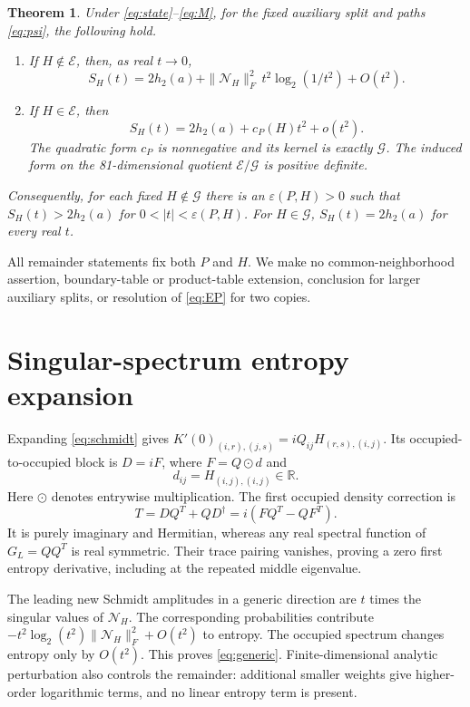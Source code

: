 \documentclass[11pt]{article}
\newcommand{\R}{\mathbb R}
\newcommand{\cE}{\mathcal E}
\newcommand{\cG}{\mathcal G}
\newtheorem{theorem}{Theorem}
\begin{document}
\begin{theorem}\label{thm:main}
Under \eqref{eq:state}--\eqref{eq:M}, for the fixed auxiliary split and paths \eqref{eq:psi}, the following hold.
\begin{enumerate}
\item If $H\notin\cE$, then, as real $t\to0$,
\begin{equation}\label{eq:generic}
 S_H(t)=2h_2(a)+\|\mathcal N_H\|_F^2\,
           t^2\log_2(1/t^2)+O(t^2).
\end{equation}
\item If $H\in\cE$, then
\begin{equation}\label{eq:quadratic}
 S_H(t)=2h_2(a)+c_P(H)t^2+o(t^2).
\end{equation}
The quadratic form $c_P$ is nonnegative and its kernel is exactly $\cG$. The induced form on the 81-dimensional quotient $\cE/\cG$ is positive definite.
\end{enumerate}
Consequently, for each fixed $H\notin\cG$ there is an $\varepsilon(P,H)>0$ such that $S_H(t)>2h_2(a)$ for $0<|t|<\varepsilon(P,H)$. For $H\in\cG$, $S_H(t)=2h_2(a)$ for every real $t$.
\end{theorem}
All remainder statements fix both $P$ and $H$. We make no common-neighborhood assertion, boundary-table or product-table extension, conclusion for larger auxiliary splits, or resolution of \eqref{eq:EP} for two copies.

\section{Singular-spectrum entropy expansion}
Expanding \eqref{eq:schmidt} gives $K'(0)_{(i,r),(j,s)}=iQ_{ij}H_{(r,s),(i,j)}$. Its occupied-to-occupied block is $D=iF$, where $F=Q\odot d$ and
\begin{equation}\label{eq:diagphase}
 d_{ij}=H_{(i,j),(i,j)}\in\R.
\end{equation}
Here $\odot$ denotes entrywise multiplication. The first occupied density correction is
\begin{equation}\label{eq:T}
 T=DQ^T+QD^\dagger=i(FQ^T-QF^T).
\end{equation}
It is purely imaginary and Hermitian, whereas any real spectral function of $G_L=QQ^T$ is real symmetric. Their trace pairing vanishes, proving a zero first entropy derivative, including at the repeated middle eigenvalue.

The leading new Schmidt amplitudes in a generic direction are $t$ times the singular values of $\mathcal N_H$. The corresponding probabilities contribute
$-t^2\log_2(t^2)\|\mathcal N_H\|_F^2+O(t^2)$ to entropy. The occupied spectrum changes entropy only by $O(t^2)$. This proves \eqref{eq:generic}. Finite-dimensional analytic perturbation also controls the remainder: additional smaller weights give higher-order logarithmic terms, and no linear entropy term is present.
\end{document}
